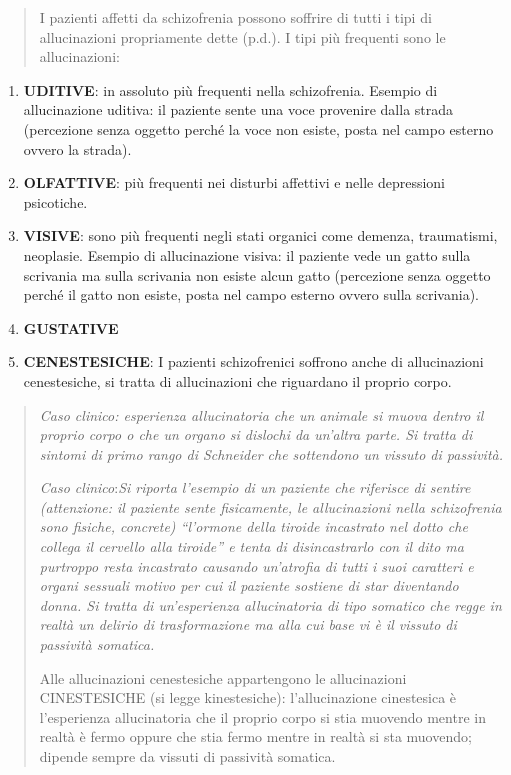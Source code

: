 \documentclass[]{article}
\begin{document}
\begin{quote}
I pazienti affetti da schizofrenia possono soffrire di tutti i tipi di
allucinazioni propriamente dette (p.d.). I tipi più frequenti sono le
allucinazioni:
\end{quote}

\begin{enumerate}
\def\labelenumi{\arabic{enumi}.}
\item
  \textbf{UDITIVE}: in assoluto più frequenti nella schizofrenia.
  Esempio di allucinazione uditiva: il paziente sente una voce provenire
  dalla strada (percezione senza oggetto perché la voce non esiste,
  posta nel campo esterno ovvero la strada).
\item
  \textbf{OLFATTIVE}: più frequenti nei disturbi affettivi e nelle
  depressioni psicotiche.
\item
  \textbf{VISIVE}: sono più frequenti negli stati organici come demenza,
  traumatismi, neoplasie. Esempio di allucinazione visiva: il paziente
  vede un gatto sulla scrivania ma sulla scrivania non esiste alcun
  gatto (percezione senza oggetto perché il gatto non esiste, posta nel
  campo esterno ovvero sulla scrivania).
\item
  \textbf{GUSTATIVE}
\item
  \textbf{CENESTESICHE}: I pazienti schizofrenici soffrono anche di
  allucinazioni cenestesiche, si tratta di allucinazioni che riguardano
  il proprio corpo.
\end{enumerate}

\begin{quote}
\emph{Caso clinico: esperienza allucinatoria che un animale si muova
dentro il proprio corpo o che un organo si dislochi da un'altra parte.
Si tratta di sintomi di primo rango di Schneider che sottendono un
vissuto di passività.}

\emph{Caso clinico}:\emph{Si riporta l'esempio di un paziente che
riferisce di sentire (attenzione: il paziente sente fisicamente, le
allucinazioni nella schizofrenia sono fisiche, concrete) ``l'ormone
della tiroide incastrato nel dotto che collega il cervello alla
tiroide'' e tenta di disincastrarlo con il dito ma purtroppo resta
incastrato causando un'atrofia di tutti i suoi caratteri e organi
sessuali motivo per cui il paziente sostiene di star diventando donna.
Si tratta di un'esperienza allucinatoria di tipo somatico che regge in
realtà un delirio di trasformazione ma alla cui base vi è il vissuto di
passività somatica. }

Alle allucinazioni cenestesiche appartengono le allucinazioni
CINESTESICHE (si legge kinestesiche): l'allucinazione cinestesica è
l'esperienza allucinatoria che il proprio corpo si stia muovendo mentre
in realtà è fermo oppure che stia fermo mentre in realtà si sta
muovendo; dipende sempre da vissuti di passività somatica.
\end{quote}
\end{document}
